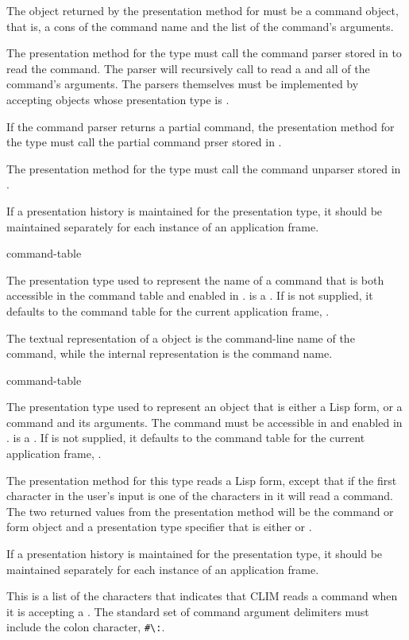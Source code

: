 The object returned by the  presentation method for 
must be a command object, that is, a cons of the command name and the list of
the command's arguments.

The  presentation method for the  type must call the
command parser stored in  to read the command.  The parser
will recursively call  to read a  and all of the
command's arguments.  The parsers themselves must be implemented by accepting
objects whose presentation type is .

If the command parser returns a partial command, the  presentation
method for the  type must call the partial command prser stored in
.

The  presentation method for the  type must call the
command unparser stored in .

If a presentation history is maintained for the  presentation type,
it should be maintained separately for each instance of an application frame.

 {\key command-table}

The presentation type used to represent the name of a command that is both
accessible in the command table  and enabled in
.   is a .  If  is not supplied, it defaults to the command
table for the current application frame, .

The textual representation of a  object is the command-line
name of the command, while the internal representation is the command name.

 {\key command-table}

The presentation type used to represent an object that is either a Lisp form, or
a command and its arguments.  The command must be accessible in
 and enabled in .  
is a .  If  is not supplied, it
defaults to the command table for the current application frame,
.

The  presentation method for this type reads a Lisp form, except that
if the first character in the user's input is one of the characters in
 it will read a command.  The two returned values from
the  presentation method will be the command or form object and a
presentation type specifier that is either  or .

If a presentation history is maintained for the 
presentation type, it should be maintained separately for each instance of an
application frame.


This is a list of the characters that indicates that CLIM reads a command when
it is accepting a .  The standard set of command argument
delimiters must include the colon character, \verb+#\:+.
